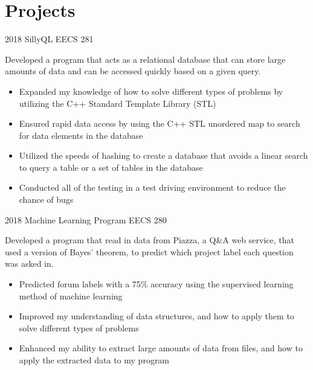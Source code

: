 \documentclass[]{cv-style}
\begin{document}
\section{Projects}
\begin{entrylist}
\entry
{2018}
{SillyQL}
{EECS 281}
{Developed a program that acts as a relational database that can store large amounts of data and can be accessed quickly based on a given query.
\begin{itemize}
    \item Expanded my knowledge of how to solve different types of problems by utilizing the C++ Standard Template Library (STL)
    \item Ensured rapid data access by using the C++ STL unordered map to search for data elements in the database
    \item Utilized the speeds of hashing to create a database that avoids a linear search to query a table or a set of tables in the database
    \item Conducted all of the testing in a test driving environment to reduce the chance of bugs 
\end{itemize}}
\entry
{2018}
{Machine Learning Program}
{EECS 280}
{Developed a program that read in data from Piazza, a Q\&A web service, that used a version of Bayes' theorem, to predict which project label each question was asked in.
\begin{itemize}
    \item Predicted forum labels with a 75\% accuracy using the supervised learning method of machine learning
    \item Improved my understanding of data structures, and how to apply them to solve different types of problems
    \item Enhanced my ability to extract large amounts of data from files, and how to apply the extracted data to my program
\end{itemize}}

\end{entrylist}
\end{document}
